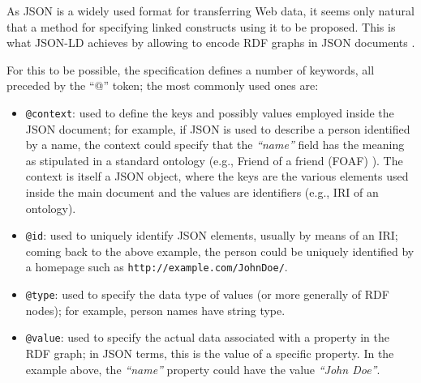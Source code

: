 
As JSON is a widely used format for transferring Web data, it seems only
natural that a method for specifying linked constructs using it to be proposed.
This is what JSON-LD achieves by allowing to encode RDF graphs in JSON
documents \cite{ref:jsonld}.

For this to be possible, the specification defines a number of keywords, all
preceded by the ``@'' token; the most commonly used ones are:
\begin{itemize}
  \item \texttt{@context}: used to define the keys and possibly values employed
                           inside the JSON document; for example, if JSON
                           is used to describe a person identified by a name,
                           the context could specify that the \textit{``name''}
                           field has the meaning as stipulated in a standard
                           ontology (e.g., Friend of a friend
                           (FOAF) \cite{ref:foaf}). The context is itself a JSON
                           object, where the keys are the various elements used
                           inside the main document and the values are
                           identifiers (e.g., IRI of an ontology).
  \item \texttt{@id}: used to uniquely identify JSON elements, usually by
                      means of an IRI; coming back to the above example, the
                      person could be uniquely identified by a homepage such as
                      \texttt{http://example.com/JohnDoe/}.
  \item \texttt{@type}: used to specify the data type of values (or more
                        generally of RDF nodes); for example, person names have
                        string type.
  \item \texttt{@value}: used to specify the actual data associated with a
                         property in the RDF graph; in JSON terms, this is the
                         value of a specific property. In the example above, the
                         \textit{``name''} property could have the value
                         \textit{``John Doe''}.
\end{itemize}

\newpage

